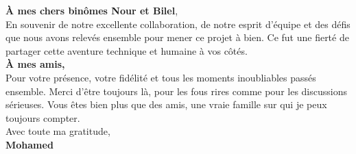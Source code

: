 \begin{center}
\begin{minipage}{0.85\textwidth}
    \textbf{À mes chers binômes Nour et Bilel},\\

  En souvenir de notre excellente collaboration, de notre esprit d'équipe et des défis que nous avons relevés ensemble pour mener ce projet à bien. Ce fut une fierté de partager cette aventure technique et humaine à vos côtés.\\

    \textbf{À mes amis,}\\

    Pour votre présence, votre fidélité et tous les moments inoubliables passés ensemble. Merci d'être toujours là, pour les fous rires comme pour les discussions sérieuses. Vous êtes bien plus que des amis, une vraie famille sur qui je peux toujours compter.\\[12pt]

    Avec toute ma gratitude,\\
    \textbf{Mohamed}

  \end{minipage}
\end{center}

\vspace*{\fill}
\newpage


\vspace*{\fill}

